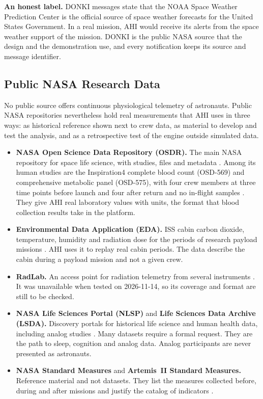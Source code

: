 \medskip\noindent\textbf{An honest label.} DONKI messages state that the NOAA Space Weather Prediction Center is the official source of space weather forecasts for the United States Government. In a real mission, AHI would receive its alerts from the space weather support of the mission. DONKI is the public NASA source that the design and the demonstration use, and every notification keeps its source and message identifier.

\subsection{Public NASA Research Data}
\label{subsec:public-data}

No public source offers continuous physiological telemetry of astronauts. Public NASA repositories nevertheless hold real measurements that AHI uses in three ways: as historical reference shown next to crew data, as material to develop and test the analysis, and as a retrospective test of the engine outside simulated data.

\begin{itemize}
\item \textbf{NASA Open Science Data Repository (OSDR).} The main NASA repository for space life science, with studies, files and metadata \cite{nasa_about_osdr}. Among its human studies are the Inspiration4 complete blood count (OSD-569) and comprehensive metabolic panel (OSD-575), with four crew members at three time points before launch and four after return and no in-flight samples \cite{osdr_osd569,osdr_osd575}. They give AHI real laboratory values with units, the format that blood collection results take in the platform.
\item \textbf{Environmental Data Application (EDA).} ISS cabin carbon dioxide, temperature, humidity and radiation dose for the periods of research payload missions \cite{osdr_eda}. AHI uses it to replay real cabin periods. The data describe the cabin during a payload mission and not a given crew.
\item \textbf{RadLab.} An access point for radiation telemetry from several instruments \cite{osdr_radlab}. It was unavailable when tested on 2026-11-14, so its coverage and format are still to be checked.
\item \textbf{NASA Life Sciences Portal (NLSP)} and \textbf{Life Sciences Data Archive (LSDA).} Discovery portals for historical life science and human health data, including analog studies \cite{nasa_nlsp,nasa_lsda}. Many datasets require a formal request. They are the path to sleep, cognition and analog data. Analog participants are never presented as astronauts.
\item \textbf{NASA Standard Measures} and \textbf{Artemis~II Standard Measures.} Reference material and not datasets. They list the measures collected before, during and after missions and justify the catalog of indicators \cite{nasa_standard_measures,nasa_artemis_ii_standard_measures}.
\end{itemize}

